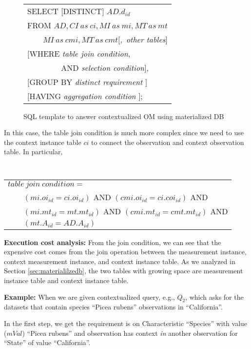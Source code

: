 \begin{figure}[htb]
{\tt
\begin{tabular}{l}
SELECT $[$DISTINCT$]$ $AD.d_{id}$\\
FROM $AD, CI~as~ci,MI~as~mi, MT~as~mt$\\
$\qquad MI~as~cmi, MT~as~cmt[,$ {\em other tables}$]$\\
$[$WHERE    {\em table join condition}, \\
$\qquad\qquad$ AND {\em selection condition}$]$,\\
$[$GROUP BY {\em distinct requirement} $]$\\
$[$HAVING   {\em aggregation condition} $]$;
\end{tabular}
}
\caption{SQL template to answer contextualized OM using materialized DB}
\label{fig:sql_matdb_context_omq}
\end{figure}

In this case, the table join condition is much more complex since we
need to use the context instance table $ci$ to connect the
observation and context observation table. 
In particular,

\vspace{0.1in}
{\tt 
\begin{tabular}{l}
$table~join~condition=$\\
$\qquad (mi.oi_{id}=ci.oi_{id})$ AND $(cmi.oi_{id}=ci.coi_{id})$ AND\\
$\qquad (mi.mt_{id}=mt.mt_{id})$ AND $(cmi.mt_{id}=cmt.mt_{id})$ AND\\
$\qquad (mt.A_{id}=AD.A_{id})$
\end{tabular}
}
\vspace{0.1in}

{\bf Execution cost analysis:} From the join condition, we can see that the expensive cost comes from
the join operation between the measurement instance, context
measurement instance, and context instance table. 
As we analyzed in Section \ref{sec:materialilzedb}, the two tables with
growing space are measurement instance table and context instance
table. 
 
{\bf Example:} When we are given contextualized query, e.g., $Q_2$, which asks for
the datasets that contain species ``Picea rubens'' observations in
``California''. 

In the first step, we get the requirement is on Characteristic
``Species'' with value ($mVal$) ``Picea rubens'' and observation has context {\em in}
another observation for ``State'' of value ``California''. 


